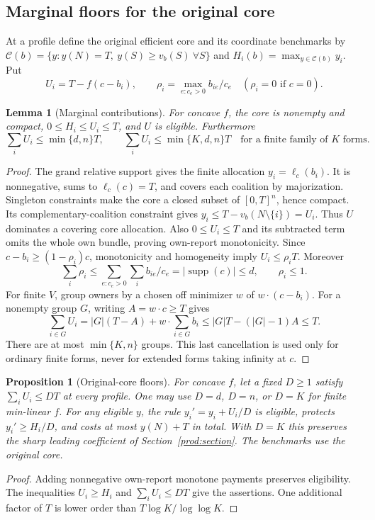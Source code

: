 \documentclass[11pt]{article}
\newtheorem{lemma}[theorem]{Lemma}
\newtheorem{proposition}[theorem]{Proposition}
\theoremstyle{definition}\newtheorem{definition}[theorem]{Definition}
\theoremstyle{remark}\newtheorem{remark}[theorem]{Remark}
\newcommand{\core}{\mathcal C}
\begin{document}
\subsection{Marginal floors for the original core}
At a profile define the original efficient core and its coordinate benchmarks
by $\core(b)=\{y:y(N)=T,\ y(S)\ge v_b(S)\ \forall S\}$ and
$H_i(b)=\max_{y\in\core(b)}y_i$.  Put
\begin{equation}\label{ext:eq:marginal}
 U_i=T-f(c-b_i),\qquad
 \rho_i=\max_{e:c_e>0}b_{ie}/c_e\quad(\rho_i=0\text{ if }c=0).
\end{equation}

\begin{lemma}[Marginal contributions]\label{ext:lem:marginal}
For concave $f$, the core is nonempty and compact,
$0\le H_i\le U_i\le T$, and $U$ is eligible.  Furthermore
\[
 \sum_iU_i\le\min\{d,n\}T,\qquad
 \sum_iU_i\le\min\{K,d,n\}T\quad\text{for a finite family of $K$ forms}.
\]
\end{lemma}
\begin{proof}
The grand relative support gives the finite allocation $y_i=\ell_c(b_i)$.
It is nonnegative, sums to $\ell_c(c)=T$, and covers each coalition by
majorization.  Singleton constraints make the core a closed subset of
$[0,T]^n$, hence compact.  Its complementary-coalition constraint gives
$y_i\le T-v_b(N\setminus\{i\})=U_i$.  Thus $U$ dominates a covering core
allocation.  Also $0\le U_i\le T$ and its subtracted term omits the whole
own bundle, proving own-report monotonicity.
Since $c-b_i\ge(1-\rho_i)c$, monotonicity and homogeneity imply
$U_i\le\rho_iT$.  Moreover
\[
 \sum_i\rho_i\le\sum_{e:c_e>0}\sum_i b_{ie}/c_e
   =|\operatorname{supp}(c)|\le d,\qquad \rho_i\le1.
\]
For finite $V$, group owners by a chosen off minimizer $w$ of $w\cdot(c-b_i)$.
For a nonempty group $G$, writing $A=w\cdot c\ge T$ gives
\[
 \sum_{i\in G}U_i=|G|(T-A)+w\cdot\sum_{i\in G}b_i
 \le|G|T-(|G|-1)A\le T.
\]
There are at most $\min\{K,n\}$ groups.  This last cancellation is used only
for ordinary finite forms, never for extended forms taking infinity at $c$.
\end{proof}

\begin{proposition}[Original-core floors]\label{ext:prop:floor}
For concave $f$, let a fixed $D\ge1$ satisfy $\sum_iU_i\le DT$ at every
profile.  One may use $D=d$, $D=n$, or $D=K$ for finite min-linear $f$.
For any eligible $y$, the rule $y_i'=y_i+U_i/D$ is eligible, protects
$y_i'\ge H_i/D$, and costs at most $y(N)+T$ in total.
With $D=K$ this preserves the sharp leading coefficient of
Section~\ref{prod:section}.  The benchmarks use the original core.
\end{proposition}
\begin{proof}
Adding nonnegative own-report monotone payments preserves eligibility.
The inequalities $U_i\ge H_i$ and $\sum_iU_i\le DT$ give the assertions.
One additional factor of $T$ is lower order than $T\log K/\log\log K$.
\end{proof}
\end{document}
